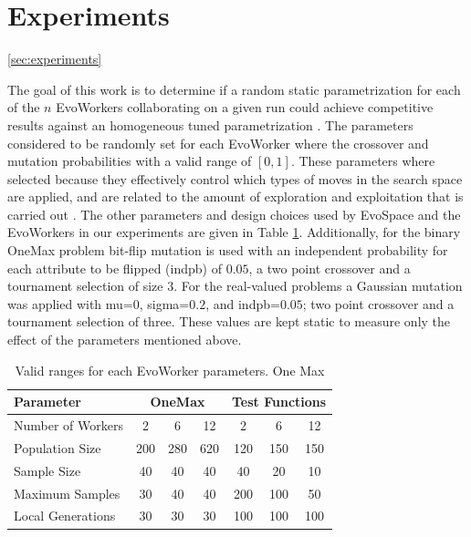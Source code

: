 \documentclass{llncs}
\begin{document}
\section{Experiments}
 \ref{sec:experiments}

The goal of this work is to determine if a random static parametrization for each of the $n$ EvoWorkers 
collaborating on a given run could achieve competitive results against an homogeneous tuned parametrization
\cite{fuku1,fuku2,garcia2014randomized}. The parameters considered to be randomly set for each EvoWorker 
where the crossover and mutation probabilities with a valid range of $[0,1]$. These parameters where 
selected because they effectively control which types of moves in the search space are
applied, and are related to the amount of exploration and exploitation that is carried out \cite{}.
The other parameters and design choices used by EvoSpace and the EvoWorkers in our experiments are given in 
Table \ref{tab:params}. Additionally, for the binary OneMax problem bit-flip mutation
is used with an independent probability for each attribute to be flipped (indpb) of $0.05$, 
a two point crossover and a tournament selection of size 3. For the real-valued problems a Gaussian
mutation was applied with mu=$0$, sigma=$0.2$, and indpb=$0.05$; two point crossover and
a tournament selection of three. These values are kept static to measure only the effect of the 
parameters mentioned above.


\begin{table}[!t]
\caption{Valid ranges for each EvoWorker parameters. One Max}
\label{tab:params}
\centering
\begin{tabular}{|l|c|c|c|c|c|c| }
\hline
\textbf{Parameter} & \multicolumn{3}{|c|}{OneMax} & \multicolumn{3}{|c|}{Test Functions} \\
\hline
Number of Workers & 2 & 6 & 12 & 2 & 6 & 12\\
\hline
\hline
Population Size & 200 & 280 & 620 & 120 & 150 & 150\\
\hline
Sample Size & 40 & 40 & 40 & 40 & 20 & 10\\
\hline
Maximum Samples & 30 & 40 & 40 & 200 & 100 & 50\\
\hline
Local Generations & 30 & 30 & 30 & 100 & 100 & 100\\
\hline
\end{tabular}
\end{table}
\end{document}

